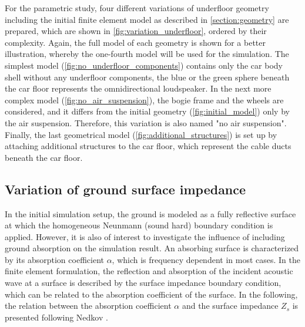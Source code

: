 {For the parametric study, four different variations of underfloor geometry including the initial finite element model as described in \cref{section:geometry} are prepared, which are shown in \cref{fig:variation_underfloor}, ordered by their complexity. Again, the full model of each geometry is shown for a better illustration, whereby the one-fourth model will be used for the simulation. The simplest model (\cref{fig:no_underfloor_components}) contains only the car body shell without any underfloor components, the blue or the green sphere beneath the car floor represents the omnidirectional loudspeaker. In the next more complex model (\cref{fig:no_air_suspension}), the bogie frame and the wheels are considered, and it differs from the initial geometry (\cref{fig:initial_model}) only by the air suspension. Therefore, this variation is also named "no air suspension". Finally, the last geometrical model (\cref{fig:additional_structures}) is set up by attaching additional structures to the car floor, which represent the cable ducts beneath the car floor.

\newpage
\subsection{Variation of ground surface impedance}

In the initial simulation setup, the ground is modeled as a fully reflective surface at which the homogeneous Neunmann (sound hard) boundary condition is applied.
However, it is also of interest to investigate the influence of including ground absorption on the simulation result.
An absorbing surface is characterized by its absorption coefficient $\alpha$, which is frequency dependent in most cases.
In the finite element formulation, the reflection and absorption of the incident acoustic wave at a surface is described by the surface impedance boundary condition, which can be related to the absorption coefficient of the surface. In the following, the relation between the absorption coefficient $\alpha$ and the surface impedance $Z_s$ is presented following Nedkov \cite{nedkov_impedance_2011}.

}
